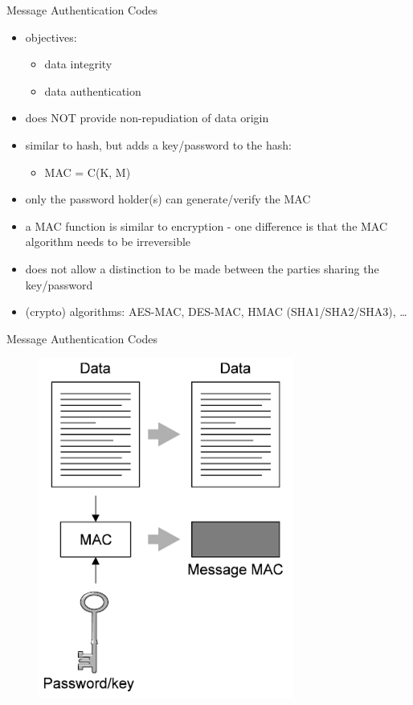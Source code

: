 \documentclass[pdf]{beamer}
\begin{document}
\begin{frame}{Message Authentication Codes}

\begin{itemize}
\item
objectives:  
\begin{itemize}
\item
data integrity
\item
data authentication
\end{itemize}

\item
does NOT provide non-repudiation of data origin

\item
similar to hash, but adds a key/password to the hash:
\begin{itemize}
\item
MAC = C(K, M)
\end{itemize}

\item
only the password holder(s) can generate/verify the MAC

\item
a MAC function is similar to encryption - one difference is that the MAC algorithm needs to be irreversible

\item
does not allow a distinction to be made between the parties sharing the key/password

\item
(crypto) algorithms: AES-MAC, DES-MAC, HMAC (SHA1/SHA2/SHA3), …

\end{itemize}
\end{frame}



\begin{frame}{Message Authentication Codes}
\begin{figure}[t]
\centering
\includegraphics[scale=0.65]{Images/MAC}
\end{figure}
\end{frame}
\end{document}
